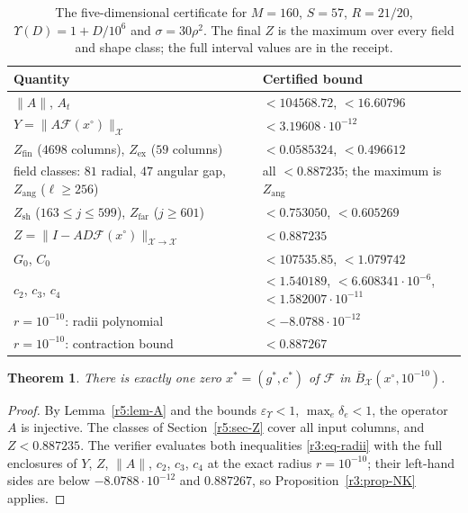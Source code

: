 \documentclass[11pt]{amsart}
\newtheorem{theorem}{Theorem}[section]
\theoremstyle{definition}
\theoremstyle{remark}
\numberwithin{equation}{section}
\newcommand{\Fc}{\mathcal{F}}
\newcommand{\eps}{\varepsilon}
\newcommand{\nrm}[1]{\lVert #1\rVert}
\begin{document}
\begin{table}[ht]
\centering\footnotesize
\begin{tabular}{@{}ll@{}}
\toprule
Quantity & Certified bound\\
\midrule
$\nrm A$, $A_t$ & $<104568.72$, $<16.60796$\\
$Y=\nrm{A\Fc(x^\circ)}_{\mathcal X}$ & $<3.19608\cdot10^{-12}$\\
$Z_{\mathrm{fin}}$ ($4698$ columns), $Z_{\mathrm{ex}}$ ($59$ columns) & $<0.0585324$, $<0.496612$\\
field classes: $81$ radial, $47$ angular gap, $Z_{\mathrm{ang}}$ ($\ell\geq256$) & all $<0.887235$; the maximum is $Z_{\mathrm{ang}}$\\
$Z_{\mathrm{sh}}$ ($163\leq j\leq599$), $Z_{\mathrm{far}}$ ($j\geq601$) & $<0.753050$, $<0.605269$\\
$Z=\nrm{I-AD\Fc(x^\circ)}_{\mathcal X\to\mathcal X}$ & $<0.887235$\\
$G_0$, $C_0$ & $<107535.85$, $<1.079742$\\
$c_2$, $c_3$, $c_4$ & $<1.540189$, $<6.608341\cdot10^{-6}$, $<1.582007\cdot10^{-11}$\\
$r=10^{-10}$: radii polynomial & $<-8.0788\cdot10^{-12}$\\
$r=10^{-10}$: contraction bound & $<0.887267$\\
\bottomrule
\end{tabular}
\caption{The five-dimensional certificate for $M=160$, $S=57$, $R=21/20$, $\Upsilon(D)=1+D/10^6$ and $\sigma=30\rho^2$. The final $Z$ is the maximum over every field and shape class; the full interval values are in the receipt.}
\label{r5:tab-bounds}
\end{table}

\begin{theorem}\label{r5:thm-zero}
There is exactly one zero $x^*=(g^*,c^*)$ of $\Fc$ in $\overline B_{\mathcal X}(x^\circ,10^{-10})$.
\end{theorem}

\begin{proof}
By Lemma~\ref{r5:lem-A} and the bounds $\eps_\Upsilon<1$, $\max_e\delta_e<1$, the operator $A$ is injective. The classes of Section~\ref{r5:sec-Z} cover all input columns, and $Z<0.887235$. The verifier evaluates both inequalities \eqref{r3:eq-radii} with the full enclosures of $Y$, $Z$, $\nrm A$, $c_2$, $c_3$, $c_4$ at the exact radius $r=10^{-10}$; their left-hand sides are below $-8.0788\cdot10^{-12}$ and $0.887267$, so Proposition~\ref{r3:prop-NK} applies.
\end{proof}
\end{document}
